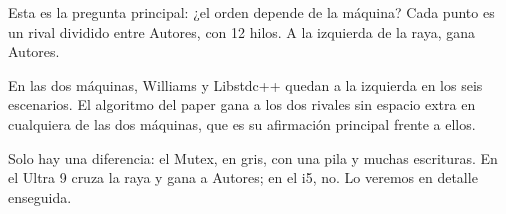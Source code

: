 Esta es la pregunta principal: ¿el orden depende de la máquina? Cada punto es un rival dividido entre Autores, con 12 hilos. A la izquierda de la raya, gana Autores.

En las dos máquinas, Williams y Libstdc++ quedan a la izquierda en los seis escenarios. El algoritmo del paper gana a los dos rivales sin espacio extra en cualquiera de las dos máquinas, que es su afirmación principal frente a ellos.

Solo hay una diferencia: el Mutex, en gris, con una pila y muchas escrituras. En el Ultra 9 cruza la raya y gana a Autores; en el i5, no. Lo veremos en detalle enseguida.
